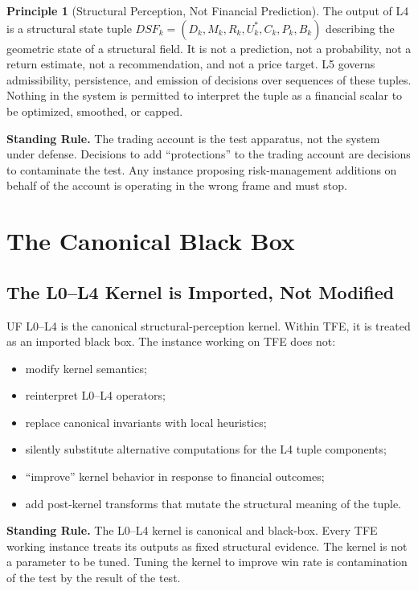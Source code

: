\documentclass[11pt, a4paper]{article}
\newcommand{\rulebox}[1]{%
  \begin{framed}\noindent\textbf{Standing Rule.} #1\end{framed}}
\theoremstyle{definition}
\newtheorem{principle}{Principle}
\begin{document}
\begin{principle}[Structural Perception, Not Financial Prediction]
The output of L4 is a structural state tuple
$DSF_k = (D_k, M_k, R_k, U_k^{\ast}, C_k, P_k, B_k)$ describing the geometric
state of a structural field. It is not a prediction, not a probability, not a
return estimate, not a recommendation, and not a price target. L5 governs
admissibility, persistence, and emission of decisions over sequences of these
tuples. Nothing in the system is permitted to interpret the tuple as a
financial scalar to be optimized, smoothed, or capped.
\end{principle}

\rulebox{The trading account is the test apparatus, not the system under
defense. Decisions to add ``protections'' to the trading account are decisions
to contaminate the test. Any instance proposing risk-management additions on
behalf of the account is operating in the wrong frame and must stop.}

\section{The Canonical Black Box}

\subsection{The L0--L4 Kernel is Imported, Not Modified}

UF L0--L4 is the canonical structural-perception kernel. Within TFE, it is
treated as an imported black box. The instance working on TFE does not:

\begin{itemize}
\item modify kernel semantics;
\item reinterpret L0--L4 operators;
\item replace canonical invariants with local heuristics;
\item silently substitute alternative computations for the L4 tuple components;
\item ``improve'' kernel behavior in response to financial outcomes;
\item add post-kernel transforms that mutate the structural meaning of the tuple.
\end{itemize}

\rulebox{The L0--L4 kernel is canonical and black-box. Every TFE working
instance treats its outputs as fixed structural evidence. The kernel is not a
parameter to be tuned. Tuning the kernel to improve win rate is contamination
of the test by the result of the test.}
\end{document}

